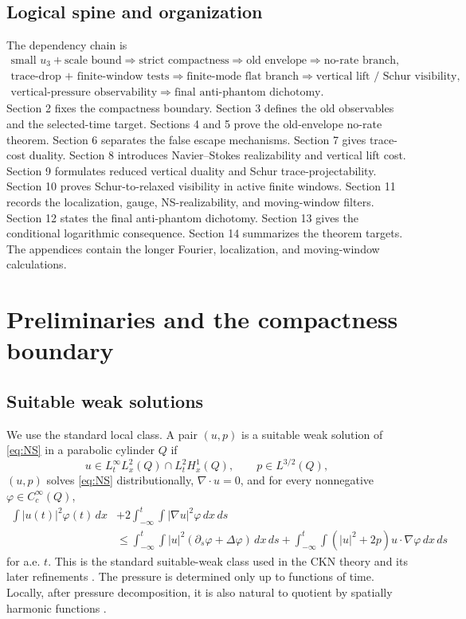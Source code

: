 \documentclass[11pt]{article}
\numberwithin{equation}{section}
\newcommand{\dx}{\,dx}
\begin{document}
\subsection{Logical spine and organization}
The dependency chain is
\[
\begin{array}{c}
\text{small }u_3+\text{scale bound}
\Rightarrow \text{strict compactness}
\Rightarrow \text{old envelope}
\Rightarrow \text{no-rate branch},\\[0.25em]
\text{trace-drop + finite-window tests}
\Rightarrow \text{finite-mode flat branch}
\Rightarrow \text{vertical lift / Schur visibility},\\[0.25em]
\text{vertical-pressure observability}
\Rightarrow \text{final anti-phantom dichotomy}.
\end{array}
\]
Section 2 fixes the compactness boundary. Section 3 defines the old observables and the selected-time target. Sections 4 and 5 prove the old-envelope no-rate theorem. Section 6 separates the false escape mechanisms. Section 7 gives trace-cost duality. Section 8 introduces Navier--Stokes realizability and vertical lift cost. Section 9 formulates reduced vertical duality and Schur trace-projectability. Section 10 proves Schur-to-relaxed visibility in active finite windows. Section 11 records the localization, gauge, NS-realizability, and moving-window filters. Section 12 states the final anti-phantom dichotomy. Section 13 gives the conditional logarithmic consequence. Section 14 summarizes the theorem targets. The appendices contain the longer Fourier, localization, and moving-window calculations.


\section{Preliminaries and the compactness boundary}\label{sec:preliminaries}

\subsection{Suitable weak solutions}

We use the standard local class.  A pair \((u,p)\) is a suitable weak solution of \eqref{eq:NS} in a parabolic cylinder \(Q\) if
\[
u\in L^\infty_tL^2_x(Q)\cap L^2_tH^1_x(Q),
\qquad
p\in L^{3/2}(Q),
\]
\((u,p)\) solves \eqref{eq:NS} distributionally, \(\nabla\cdot u=0\), and for every nonnegative \(\varphi\in C_c^\infty(Q)\),
\begin{align}\label{eq:local-energy}
\int |u(t)|^2\varphi(t)\dx
&+2\int_{-\infty}^t\int |\nabla u|^2\varphi\dx\,ds
\nonumber\\
&\le
\int_{-\infty}^t\int |u|^2(\partial_s\varphi+\Delta\varphi)\dx\,ds
+
\int_{-\infty}^t\int (|u|^2+2p)u\cdot\nabla\varphi\dx\,ds
\end{align}
for a.e. \(t\).  This is the standard suitable-weak class used in the CKN theory and its later refinements \cite{CKN1982,Lin1998,Seregin2015,Vasseur2007}. The pressure is determined only up to functions of time.  Locally, after pressure decomposition, it is also natural to quotient by spatially harmonic functions \cite{SohrWahl1986,Wolf2017,Yu2026HarmonicPressure}.
\end{document}
